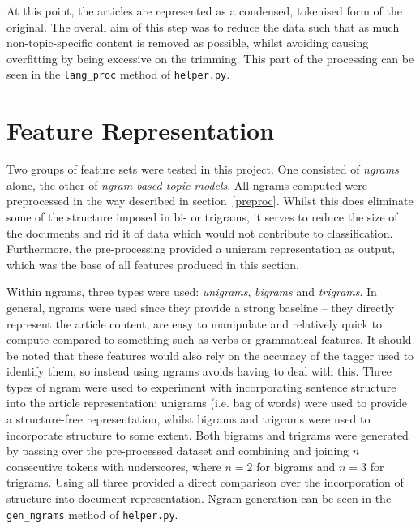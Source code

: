 \documentclass[11pt]{article}
\begin{document}
At this point, the articles are represented as a condensed, tokenised form of the original. The overall aim of this step was to reduce the data such that as much non-topic-specific content is removed as possible, whilst avoiding causing overfitting by being excessive on the trimming. This part of the processing can be seen in the \texttt{lang\_proc} method of \texttt{helper.py}.

\section{Feature Representation}
Two groups of feature sets were tested in this project. One consisted of \textit{ngrams} alone, the other of \textit{ngram-based topic models}. All ngrams computed were preprocessed in the way described in section~\ref{preproc}. Whilst this does eliminate some of the structure imposed in bi- or trigrams, it serves to reduce the size of the documents and rid it of data which would not contribute to classification. Furthermore, the pre-processing provided a unigram representation as output, which was the base of all features produced in this section.

Within ngrams, three types were used: \textit{unigrams}, \textit{bigrams} and \textit{trigrams}. In general, ngrams were used since they provide a strong baseline – they directly represent the article content, are easy to manipulate and relatively quick to compute compared to something such as verbs or grammatical features. It should be noted that these features would also rely on the accuracy of the tagger used to identify them, so instead using ngrams avoids having to deal with this. Three types of ngram were used to experiment with incorporating sentence structure into the article representation: unigrams (i.e. bag of words) were used to provide a structure-free representation, whilst bigrams and trigrams were used to incorporate structure to some extent. Both bigrams and trigrams were generated by passing over the pre-processed dataset and combining and joining $n$ consecutive tokens with underscores, where $n=2$ for bigrams and $n=3$ for trigrams. Using all three provided a direct comparison over the incorporation of structure into document representation. Ngram generation can be seen in the \texttt{gen\_ngrams} method of \texttt{helper.py}.
\end{document}
